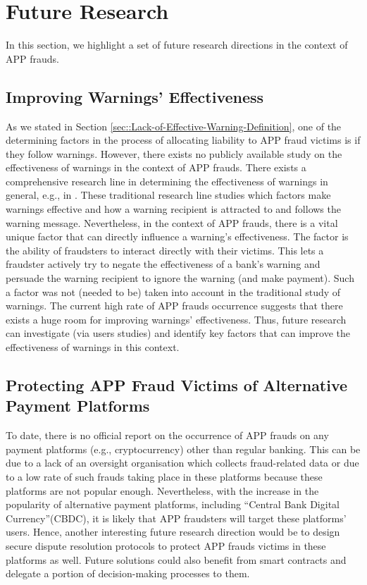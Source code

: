 
\clearpage
\section{Future Research}\label{sec::Future-Research}


In this section, we highlight a set of future research directions in the context of APP frauds. 

\subsection{Improving Warnings' Effectiveness}

As we stated in  Section \ref{sec::Lack-of-Effective-Warning-Definition},  one of the determining factors in the process of allocating liability to APP fraud victims is if they follow warnings. However,  there exists no publicly available study on the effectiveness of warnings in the context of APP frauds. There exists a comprehensive research line in determining the effectiveness of warnings in general, e.g., in \cite{brinton2016users,felt2014experimenting,laughery2006designing}. These traditional research line studies which factors make warnings effective and how a warning recipient is attracted to and follows the warning message. Nevertheless, in the context of APP frauds, there is a vital unique factor that can directly influence a warning's effectiveness. The factor is the ability of fraudsters to interact directly with their victims. This lets a fraudster actively try to negate the effectiveness of a bank's warning and persuade the warning recipient to ignore the warning (and make payment). Such a factor was not (needed to be) taken into account in the traditional study of warnings. The current high rate of  APP frauds occurrence suggests that there exists a huge room for improving warnings' effectiveness. Thus, future research can investigate (via users studies) and identify key factors that can improve the effectiveness of warnings in this context. 


\subsection{Protecting APP Fraud Victims of Alternative Payment Platforms}

To date, there is no official report on the occurrence of APP frauds on any payment platforms (e.g., cryptocurrency) other than regular banking. This can be due to a lack of an oversight organisation which collects fraud-related data or due to a low rate of such frauds taking place in these platforms because these platforms are not popular enough. Nevertheless,  with the increase in the popularity of alternative payment platforms, including ``Central Bank Digital Currency''(CBDC), it is likely that APP fraudsters will target these platforms' users. Hence, another interesting future research direction would be to design secure dispute resolution protocols to protect  APP frauds victims in these platforms as well. Future solutions could also benefit from smart contracts and delegate a portion of decision-making processes to them.    

